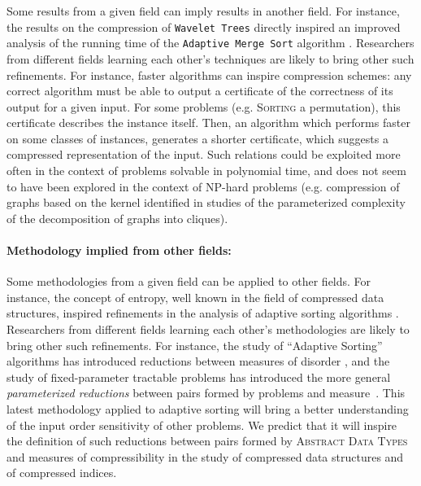 \documentclass[a4paper,10pt]{article}
\begin{document}
Some results from a given field can imply results in another field. 
%
For instance, the results on the compression of \texttt{Wavelet Trees} directly inspired an improved analysis of the running time of the \texttt{Adaptive Merge Sort} algorithm \cite{2013-TCS-CompressedRepresentationsOfPermutationsAndApplications-BarbayNavarro}.  
%
Researchers from different fields learning each other's techniques are likely to bring other such refinements.
%
For instance, faster algorithms can inspire compression schemes: any correct algorithm must be able to output a certificate of the correctness of its output for a given input. For some problems (e.g. \textsc{Sorting} a permutation), this certificate describes the instance itself. Then, an algorithm which performs faster on some classes of instances, generates a shorter certificate, which suggests a compressed representation of the input.
% 
Such relations could be exploited more often in the context of problems solvable in polynomial time, and does not seem to have been explored in the context of NP-hard problems (e.g. compression of graphs based on the kernel identified in studies of the parameterized complexity of the decomposition of graphs into cliques).

\paragraph{Methodology implied from other fields:}

Some methodologies from a given field can be applied to other fields.
%
For instance, the concept of entropy, well known in the field of compressed data structures, inspired refinements in the analysis of adaptive sorting algorithms \cite{2013-TCS-CompressedRepresentationsOfPermutationsAndApplications-BarbayNavarro}.
%
Researchers from different fields learning each other's methodologies are likely to bring other such refinements.
%
For instance, the study of ``Adaptive Sorting'' algorithms has introduced reductions between measures of disorder \cite{1992-ACJ-AnOverviewOfAdaptiveSorting-MoffatPetersson,1995-DAM-AFrameworkForAdaptiveSorting-PeterssonMoffat}, and the study of fixed-parameter tractable problems has introduced the more general \emph{parameterized reductions} between pairs formed by problems and measure~\cite{DowneyF13,CyganFKLMPPS15}. This latest methodology applied to adaptive sorting will bring a better understanding of the input order sensitivity of other problems. We predict that it will inspire the definition of such reductions between pairs formed by \textsc{Abstract Data Types} and measures of compressibility in the study of compressed data structures and of compressed indices.
\end{document}
